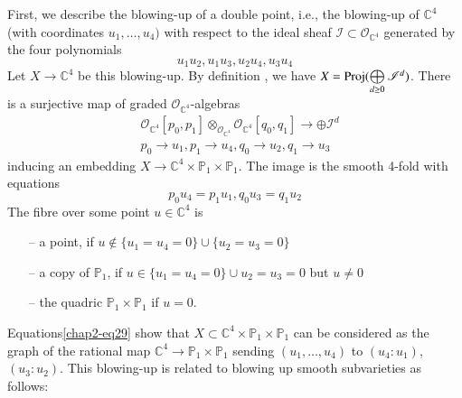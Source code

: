 First, we describe the blowing-up of a double point, i.e., the
blowing-up of $\mathbb{C}^{4}$ (with coordinates $u_{1},\ldots,u_{4})$
with respect to the ideal sheaf
$\mathscr{I}\subset \mathscr{O}_{\mathbb{C}^4}$ generated by the four
polynomials
$$
u_{1}u_{2},u_{1}u_{3},u_{2}u_{4},u_{3}u_{4}
$$
Let $X\to \mathbb{C}^{4}$ be this blowing-up. By
definition \cite[p.163]{chap2-key5}, we have $X=\operatorname{Proj}
(\bigoplus\limits_{d\geq 0}\mathscr{I}^{d})$. There is a surjective
map of graded $\mathscr{O}_{\mathbb{C}^{4}}$-algebras
\begin{align*}
& \mathscr{O}_{\mathbb{C}^{4}}[p_{0},p_{1}]\otimes_{\mathscr{O}_{\mathbb{C}^{4}}}\mathscr{O}_{\mathbb{C}^{4}}[q_{0},q_{1}]\to \oplus \mathscr{I}^{d}\\[4pt]
& p_{0}\to u_{1}, p_{1}\to u_{4}, q_{0}\to u_{2}, q_{1}\to u_{3}
\end{align*}
inducing an embedding
$X\to \mathbb{C}^{4}\times \mathbb{P}_{1}\times \mathbb{P}_{1}$. The
image is the smooth 4-fold with equations
\begin{equation}
p_{0}u_{4}=p_{1}u_{1}, q_{0}u_{3}=q_{1}u_{2}\label{chap2-eq29}
\end{equation}
The fibre over some point $u\in \mathbb{C}^{4}$ is
\begin{itemize}
\item[--] a point, if
$u\not\in \{u_{1}=u_{4}=0\}\cup \{u_{2}=u_{3}=0\}$

\item[--] a copy of $\mathbb{P}_{1}$, if $u\in \{u_{1}=u_{4}=0\}\cup
u_{2}=u_{3}=0$ but $u\neq 0$

\item[--] the quadric $\mathbb{P}_{1}\times \mathbb{P}_{1}$ if $u=0$.
\end{itemize}
Equations\pageoriginale \eqref{chap2-eq29} show that
$X\subset \mathbb{C}^{4}\times \mathbb{P}_{1}\times \mathbb{P}_{1}$
can be considered as the graph of the rational map
$\mathbb{C}^{4}\to \mathbb{P}_{1}\times \mathbb{P}_{1}$ sending
$(u_{1},\ldots,u_{4})$ to $(u_{4}:u_{1})$, $(u_{3}:u_{2})$. This
blowing-up is related to blowing up smooth subvarieties as follows:

